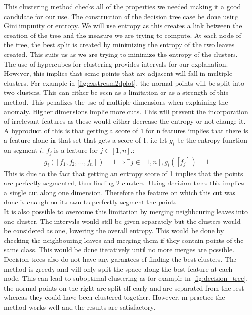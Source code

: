 \documentclass[oneside, a4paper, onecolumn, 11pt]{article}
\begin{document}
This clustering method checks all of the properties we needed making it a good candidate for our use. The construction of the decision tree case be done using Gini impurity or entropy. We will use entropy as this creates a link between the creation of the tree and the measure we are trying to compute. At each node of the tree, the best split is created by minimizing the entropy of the two leaves created. This suits us as we are trying to minimize the entropy of the clusters.\\
The use of hypercubes for clustering provides intervals for our explanation. However, this implies that some points that are adjacent will fall in multiple clusters. For example in \autoref{fig:exstream2dplot}, the normal points will be split into two clusters. This can either be seen as a limitation or as a strength of this method. This penalizes the use of multiple dimensions when explaining the anomaly. Higher dimensions implie more cuts. This will prevent the incorporation of irrelevant features as these would either decrease the entropy or not change it. A byproduct of this is that getting a score of 1 for n features implies that there is a feature alone in that set that gets a score of 1. i.e let $g_i$ be the entropy function on segment $i$. $f_j$ is a feature for $j\in[1, n]$.:
\begin{align*}
  g_i([f_1, f_2, ..., f_n]) = 1 \Rightarrow \exists j \in [1, n], g_i([f_j]) = 1
\end{align*}
This is due to the fact that getting an entropy score of 1 implies that the points are perfectly segmented, thus finding 2 clusters. Using decision trees this implies a single cut along one dimension. Therefore the feature on which this cut was done is enough on its own to perfectly segment the points.\\
It is also possible to overcome this limitation by merging neighbouring leaves into one cluster. The intervals would still be given separately but the clusters would be considered as one, lowering the overall entropy. This would be done by checking the neighbouring leaves and merging them if they contain points of the same class. This would be done iteratively until no more merges are possible.\\
Decision trees also do not have any garantees of finding the best clusters. The method is greedy and will only split the space along the best feature at each node. This can lead to suboptimal clustering as for example in \autoref{fig:decision_tree}, the normal points on the right are split off early and are separated from the rest whereas they could have been clustered together. However, in practice the method works well and the results are satisfactory.\\
\end{document}
